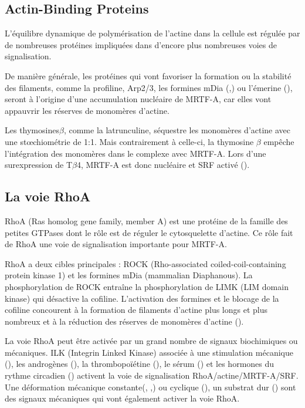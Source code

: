 \subsection{Actin-Binding Proteins}

L'équilibre dynamique de polymérisation de l'actine dans la cellule est régulée par de nombreuses protéines impliquées dans d'encore plus nombreuses voies de signalisation. 

De manière générale, les protéines qui vont favoriser la formation ou la stabilité des filaments, comme la profiline, Arp2/3, les formines mDia (\cite{chan_force-induced_2010},\cite{baarlink_nuclear_2013}) ou l'émerine (\cite{ho_lamin_2013}), seront à l'origine d'une accumulation nucléaire de MRTF-A, car elles vont appauvrir les réserves de monomères d'actine. 



Les thymosines$\beta$, comme la latrunculine, séquestre les monomères d'actine avec une st\oe chiométrie de 1:1. Mais contrairement à celle-ci, la thymosine $\beta$ empêche l'intégration des monomères dans le complexe avec MRTF-A. Lors d'une surexpression de T$\beta$4, MRTF-A est donc nucléaire et SRF activé (\cite{morita_g-actin_2013}).




\subsection{La voie RhoA}

RhoA (Ras homolog gene family, member A) est une protéine de la famille des petites GTPases dont le rôle est de réguler le cytosquelette d'actine. Ce rôle fait de RhoA une voie de signalisation importante pour MRTF-A. 

RhoA a deux cibles principales : ROCK (Rho-associated coiled-coil-containing protein kinase 1) et les formines mDia (mammalian Diaphanous). La phosphorylation de ROCK entraîne la phosphorylation de LIMK (LIM domain kinase) qui désactive la cofiline. L'activation des formines et le blocage de la cofiline concourent à la formation de filaments d'actine plus longs et plus nombreux et à la réduction des réserves de monomères d'actine (\cite{zhao_force_2007}). 

La voie RhoA peut être activée par un grand nombre de signaux biochimiques ou mécaniques. ILK (Integrin Linked Kinase) associée à une stimulation mécanique (\cite{maier_tenascin-c_2008}), les androgènes (\cite{schmidt_rhoa_2012}), la thrombopoïétine (\cite{smith_induction_2013}), le sérum (\cite{sotiropoulos_signal-regulated_1999}) et les hormones du rythme circadien (\cite{gerber_blood-borne_2013}) activent la voie de signalisation RhoA/actine/MRTF-A/SRF. 
Une déformation mécanique constante(\cite{albinsson_stretch_2004}, \cite{zhao_force_2007},\cite{chan_force-induced_2010}) ou cyclique (\cite{kuwahara_myocardin-related_2010}), un substrat dur (\cite{huang_matrix_2012}) sont des signaux mécaniques qui vont également activer la voie RhoA. 


